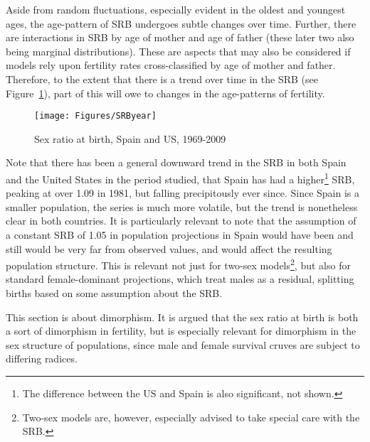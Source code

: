 Aside from random fluctuations, especially evident in the oldest and youngest
ages, the age-pattern of SRB undergoes subtle changes over time. Further, there
are interactions in SRB by age of mother and age of father (these later two
also being marginal distributions). These are aspects that may also be
considered if models rely upon fertility rates cross-classified by age of mother
and father. Therefore, to the extent that there is a trend over time in the SRB
(see Figure~\ref{fig:SRByears}), part of this will owe to changes in the
age-patterns of fertility.

\begin{figure}[ht!]
        \centering  
          \caption{Sex ratio at birth, Spain
          and US, 1969-2009}
           \texttt{[image: Figures/SRByear]}
          \label{fig:SRByears}
\end{figure}

Note that there has been a general downward trend in the SRB in both Spain and
the United States in the period studied, that Spain has had a
higher\footnote{The difference between the US and Spain is also significant, not
shown.} SRB, peaking at over 1.09 in 1981, but falling precipitously ever since. Since Spain is a
smaller population, the series is much more volatile, but the trend is
nonetheless clear in both countries. It is particularly relevant to note that
the assumption of a constant SRB of 1.05 in population projections in Spain
would have been and still would be very far from observed values, and would 
affect the resulting population structure. This is relevant not
just for two-sex models\footnote{Two-sex models are, however, especially advised
to take special care with the SRB.}, but also for standard female-dominant
projections, which treat males as a residual, splitting births based on some
assumption about the SRB.

This section is about dimorphism. It is argued that the sex ratio at birth
is both a sort of dimorphism in fertility, but is especially relevant for
dimorphism in the sex structure of populations, since male and female survival
cruves are subject to differing radices. 
